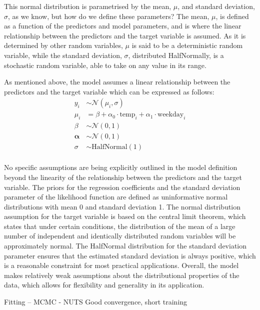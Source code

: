This normal distribution is parametrised by the mean, $\mu$, and
standard deviation, $\sigma$, as we know, but how do we define these
parameters? The mean, $\mu$, is defined as a function of the predictors and
model parameters, and is where the linear relationship between the predictors
and the target variable is assumed. As it is determined by other random
variables, $\mu$ is said to be a deterministic random variable, while the
standard deviation, $\sigma$, distributed HalfNormally, is a stochastic
random variable, able to take on any value in its range.

As mentioned above, the model assumes a linear relationship between the 
predictors and the target variable which can be expressed as follows:
\begin{equation}
  \label{eq:temp_weekday_model}
  \begin{split}
    y_i &\sim \mathcal{N}(\mu_i, \sigma) \\
    \mu_i &= \beta + \alpha_0 \cdot \text{temp}_i + \alpha_1 \cdot \text{weekday}_i \\
    \beta &\sim \mathcal{N}(0, 1) \\
    \boldsymbol{\alpha} &\sim \mathcal{N}(0, 1) \\
    \sigma &\sim \text{HalfNormal}(1) \\
  \end{split}
\end{equation}

No specific assumptions are being explicitly outlined in the model definition
beyond the linearity of the relationship between the predictors and the target
variable. The priors for the regression coefficients and the standard deviation
parameter of the likelihood function are defined as uninformative normal
distributions with mean 0 and standard deviation 1. The normal distribution
assumption for the target variable is based on the central limit theorem, which
states that under certain conditions, the distribution of the mean of a large
number of independent and identically distributed random variables will be
approximately normal. The HalfNormal distribution for the standard deviation
parameter ensures that the estimated standard deviation is always positive,
which is a reasonable constraint for most practical applications. Overall, the
model makes relatively weak assumptions about the distributional properties of
the data, which allows for flexibility and generality in its application.

Fitting
-- MCMC
  - NUTS
Good convergence, short training

